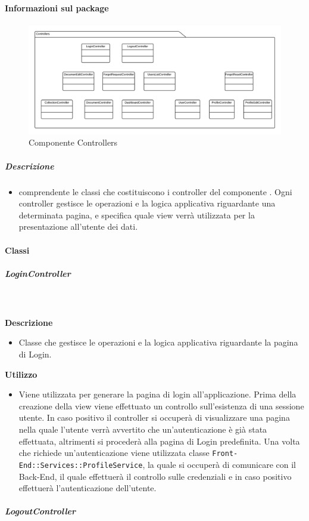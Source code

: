   \paragraph{Informazioni sul package}
    \begin{figure}[H] 
      \begin{center}
        \includegraphics[width=\textwidth]{uml/package/Front-end::Controllers.png}
        \caption{Componente Controllers}
      \end{center}  
    \end{figure} 
  \subparagraph{Descrizione} 
    \begin{itemize}
    \item[]  comprendente le classi che costituiscono i controller del componente . Ogni controller gestisce le operazioni e la logica applicativa riguardante una determinata pagina, e specifica quale view verrà utilizzata per la presentazione all'utente dei dati.
    \end{itemize} 
    \paragraph{Classi}
      \subparagraph{LoginController}
        
        \textbf{\\ \\ Descrizione} 
          \begin{itemize}
            \item[] Classe che gestisce le operazioni e la logica applicativa riguardante la pagina di Login.
          \end{itemize}      
        \textbf{Utilizzo}  
          \begin{itemize}
            \item[] Viene utilizzata per generare la pagina di login all'applicazione. Prima della creazione della view viene effettuato un controllo sull'esistenza di una sessione utente. In caso positivo il controller si occuperà di visualizzare una pagina nella quale l'utente verrà avvertito che un'autenticazione è già stata effettuata, altrimenti si procederà alla pagina di Login predefinita. Una volta che richiede un'autenticazione viene utilizzata classe \texttt{Front-End::Services::ProfileService}, la quale si occuperà di comunicare con il Back-End, il quale effettuerà il controllo sulle credenziali e in caso positivo effettuerà l'autenticazione dell'utente.
          \end{itemize}
      \subparagraph{LogoutController}
        
